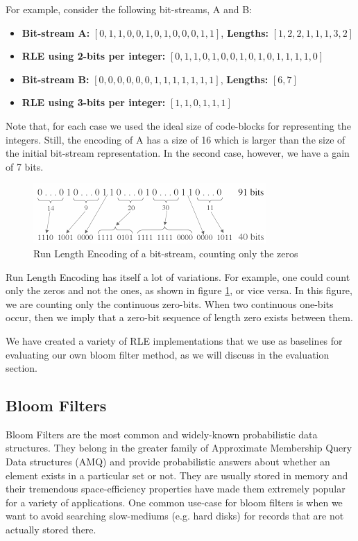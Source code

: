     For example, consider the following bit-streams, A and B:
    
    \begin{itemize}
        \item {\bf Bit-stream A:} $[0,1,1,0,0,1,0,1,0,0,0,1,1]$, {\bf Lengths:} $[1,2,2,1,1,1,3,2]$
        \item {\bf RLE using 2-bits per integer:} $[0,1, 1,0, 1,0, 0,1, 0,1, 0,1, 1,1, 1,0]$
        \item {\bf Bit-stream B:} $[0,0,0,0,0,0,1,1,1,1,1,1,1]$, {\bf Lengths:} $[6,7]$
        \item {\bf RLE using 3-bits per integer:} $[1,1,0, 1,1,1]$
    \end{itemize}
    
    Note that, for each case we used the ideal size of code-blocks for representing the integers.
    Still, the encoding of A has a size of 16 which is larger than the size of the initial bit-stream representation.
    In the second case, however, we have a gain of 7 bits.
    
    \begin{figure}[h]
    \centering
    \includegraphics[scale=1]{thesis/figures/rle.png}
    \caption{Run Length Encoding of a bit-stream, counting only the zeros}
    \label{rle}
    \end{figure}
    
    Run Length Encoding has itself a lot of variations. 
    For example, one could count only the zeros and not the ones, as shown in figure \ref{rle}, or vice versa. In this figure, we are counting only the continuous zero-bits. When two continuous one-bits occur, then we imply that a zero-bit sequence of length zero exists between them.
    
    We have created a variety of RLE implementations that we use as baselines for evaluating our own bloom filter method, as we will discuss in the evaluation section. 
    
    \newpage
    \subsection{Bloom Filters}
        Bloom Filters are the most common and widely-known probabilistic data structures.
        They belong in the greater family of Approximate Membership Query Data structures (AMQ) and provide probabilistic answers about whether an element exists in a
        particular set or not.
        They are usually stored in memory and their tremendous space-efficiency properties have made them extremely popular for a variety of applications.
        One common use-case for bloom filters is when we want to avoid searching slow-mediums (e.g. hard disks) for records that are not actually stored there.
        
